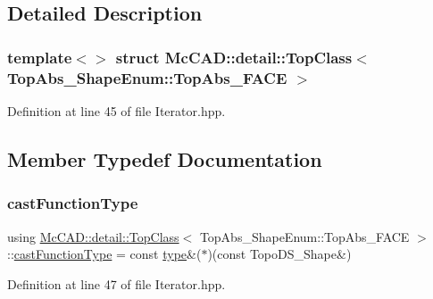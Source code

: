 \subsection{Detailed Description}
\subsubsection*{template$<$$>$\newline
struct Mc\+C\+A\+D\+::detail\+::\+Top\+Class$<$ Top\+Abs\+\_\+\+Shape\+Enum\+::\+Top\+Abs\+\_\+\+F\+A\+C\+E $>$}



Definition at line 45 of file Iterator.\+hpp.



\subsection{Member Typedef Documentation}
\mbox{\label{structMcCAD_1_1detail_1_1TopClass_3_01TopAbs__ShapeEnum_1_1TopAbs__FACE_01_4_ac529ada2f943ba0b7d0b5154805bdfbd}} 
\subsubsection{\texorpdfstring{cast\+Function\+Type}{castFunctionType}}
{\footnotesize\ttfamily using \hyperlink{structMcCAD_1_1detail_1_1TopClass}{Mc\+C\+A\+D\+::detail\+::\+Top\+Class}$<$ Top\+Abs\+\_\+\+Shape\+Enum\+::\+Top\+Abs\+\_\+\+F\+A\+CE $>$\+::\hyperlink{structMcCAD_1_1detail_1_1TopClass_3_01TopAbs__ShapeEnum_1_1TopAbs__FACE_01_4_ac529ada2f943ba0b7d0b5154805bdfbd}{cast\+Function\+Type} =  const \hyperlink{structMcCAD_1_1detail_1_1TopClass_3_01TopAbs__ShapeEnum_1_1TopAbs__FACE_01_4_a3c802e4d15e9fbb32d63b27ed9194171}{type}\&($\ast$)(const Topo\+D\+S\+\_\+\+Shape\&)}



Definition at line 47 of file Iterator.\+hpp.


